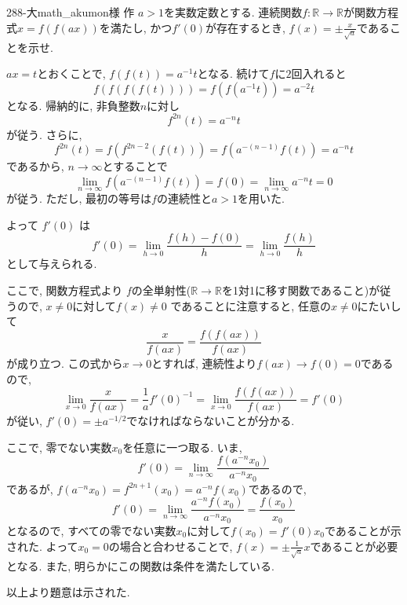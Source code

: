 \begin{prob}{288}{-大}{math\_akumon様 作}
$a>1$を実数定数とする. 連続関数$f:\mathbb{R}\to \mathbb{R}$が関数方程式$x = f(f(ax))$を満たし, かつ$f'(0)$が存在するとき, $f(x) = \pm \frac{x}{\sqrt{a}}$であることを示せ.
\end{prob}

$ax = t$とおくことで, $f(f(t)) = a^{-1} t$となる. 続けて$f$に$2$回入れると
$$
f(f(f(f(t)))) = f(f(a^{-1}t)) = a^{-2}t
$$
となる. 帰納的に, 非負整数$n$に対し
$$
f^{2n}(t) = a^{-n} t
$$
が従う. さらに,
$$
f^{2n}(t) = f(f^{2n-2}(f(t))) = f(a^{-(n-1)}f(t) ) = a^{-n}t
$$
であるから, $n\to \infty$とすることで
$$
\lim_{n\to \infty} f(a^{-(n-1)} f(t)) = f(0) = \lim_{n\to \infty} a^{-n}t = 0
$$
が従う. ただし, 最初の等号は$f$の連続性と$a>1$を用いた.

よって $f'(0)$ は
\[
f'(0) = \lim_{h\to 0} \frac{f(h) - f(0)}{h} = \lim_{h\to 0} \frac{f(h)}{h}
\]
として与えられる.

ここで, 関数方程式より $f$の全単射性($\mathbb{R}\to \mathbb{R}$を1対1に移す関数であること)が従うので, $x\neq 0$に対して$f(x) \neq 0$ であることに注意すると, 任意の$x\neq 0$にたいして
\[
\frac{x}{f(ax)} = \frac{f(f(ax))}{f(ax)}
\]
が成り立つ. この式から$x\to 0$とすれば, 連続性より$f(ax)\to f(0) = 0$であるので,
\[
\lim_{x\to 0}\frac{x}{f(ax)} = \frac{1}{a}f'(0)^{-1} = \lim_{x\to 0} \frac{f(f(ax))}{f(ax)} = f'(0)
\]
が従い, $f'(0) = \pm a^{-1/2}$でなければならないことが分かる.

ここで, 零でない実数$x_0$を任意に一つ取る. いま,
\[
f'(0) = \lim_{n\to \infty} \frac{f(a^{-n}x_0)}{a^{-n}x_0}
\]
であるが, $f(a^{-n}x_0) = f^{2n+1}(x_0) = a^{-n}f(x_0)$であるので,
\[
f'(0) = \lim_{n\to \infty} \frac{a^{-n}f(x_0)}{a^{-n}x_0} = \frac{f(x_0)}{x_0}
\]
となるので, すべての零でない実数$x_0$に対して$f(x_0) = f'(0)x_0$であることが示された. よって$x_0=0$の場合と合わせることで, $f(x) = \pm\frac{1}{\sqrt{a}}x$であることが必要となる. また, 明らかにこの関数は条件を満たしている.

以上より題意は示された.
